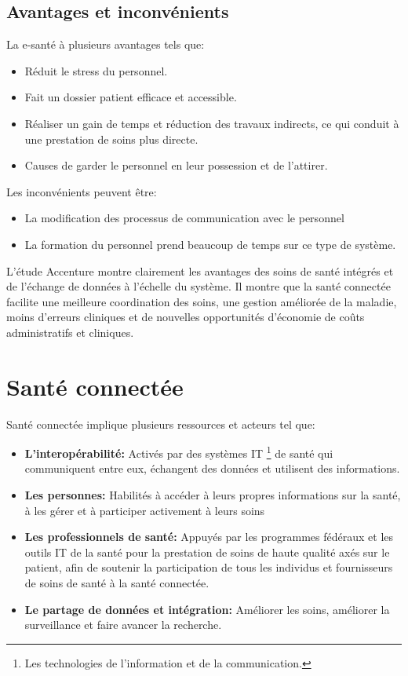 \documentclass[12pt]{article}
\begin{document}
\subsection{Avantages et inconvénients}
La e-santé à plusieurs avantages tels que:
\begin{itemize}
	\item Réduit le stress du personnel.
	\item Fait un dossier patient efficace et accessible.
	\item Réaliser un gain de temps et réduction des travaux indirects, ce qui conduit à une prestation de soins plus directe.
	\item Causes de garder le personnel en leur possession et de l'attirer.
\end{itemize}

Les inconvénients peuvent être:
\begin{itemize}
	\item La modification des processus de communication avec le personnel
	\item La formation du personnel prend beaucoup de temps sur ce type de système.\\
\end{itemize}

L'étude Accenture \cite{28} montre clairement les avantages des soins de santé intégrés et de l'échange de données à l'échelle du système. Il montre que la santé connectée facilite une meilleure coordination des soins, une gestion améliorée de la maladie, moins d'erreurs cliniques et de nouvelles opportunités d'économie de coûts administratifs et cliniques.

\section{Santé connectée}
Santé connectée implique plusieurs ressources et acteurs tel que:
\begin{itemize}
	\item \textbf{L’interopérabilité:} Activés par des systèmes IT \footnote{Les technologies de l'information et de la communication.} de santé qui communiquent entre eux, échangent des données et utilisent des informations.
	\item \textbf{Les personnes:} Habilités à accéder à leurs propres informations sur la santé, à les gérer et à participer activement à leurs soins
	\item \textbf{Les professionnels de santé:} Appuyés par les programmes fédéraux et les outils IT de la santé pour la prestation de soins de haute qualité axés sur le patient, afin de soutenir la participation de tous les individus et fournisseurs de soins de santé à la santé connectée.
	\item \textbf{Le partage de données et intégration:} Améliorer les soins, améliorer la surveillance et faire avancer la recherche.\\
	
\end{itemize}
\end{document}
